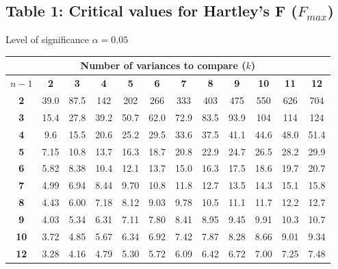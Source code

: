 \subsection{Table 1: Critical values for Hartley’s F ($F_{max}$)}
\label{table1}

Level of significance $\alpha = 0.05$ \\
\begin{center}
\small
\begin{tabular}{c|c|c|c|c|c|c|c|c|c|c|c}
\hline
\multicolumn{12}{c}{\textbf{Number of variances to compare} ($k$)}                    \bstrut\tstrut\\
\hline
$n - 1$ & \multicolumn{1}{c}{\textbf{2}}    & \multicolumn{1}{c}{\textbf{3}}    & \multicolumn{1}{c}{\textbf{4}}    & \multicolumn{1}{c}{\textbf{5}}    & \multicolumn{1}{c}{\textbf{6}}    & \multicolumn{1}{c}{\textbf{7}}    & \multicolumn{1}{c}{\textbf{8}}    & \multicolumn{1}{c}{\textbf{9}}    & \multicolumn{1}{c}{\textbf{10}}   & \multicolumn{1}{c}{\textbf{11}}   & \multicolumn{1}{c}{\textbf{12}} \bstrut\tstrut\\
\hline
\textbf{2}     & 39.0 & 87.5 & 142  & 202  & 266  & 333  & 403  & 475  & 550  & 626  & 704  \bstrut\tstrut\\
\textbf{3}     & 15.4 & 27.8 & 39.2 & 50.7 & 62.0 & 72.9 & 83.5 & 93.9 & 104  & 114  & 124  \bstrut\tstrut\\
\textbf{4}     & 9.6  & 15.5 & 20.6 & 25.2 & 29.5 & 33.6 & 37.5 & 41.1 & 44.6 & 48.0 & 51.4 \bstrut\tstrut\\
\textbf{5}     & 7.15 & 10.8 & 13.7 & 16.3 & 18.7 & 20.8 & 22.9 & 24.7 & 26.5 & 28.2 & 29.9 \bstrut\tstrut\\
\textbf{6}     & 5.82 & 8.38 & 10.4 & 12.1 & 13.7 & 15.0 & 16.3 & 17.5 & 18.6 & 19.7 & 20.7 \bstrut\tstrut\\
\textbf{7}     & 4.99 & 6.94 & 8.44 & 9.70 & 10.8 & 11.8 & 12.7 & 13.5 & 14.3 & 15.1 & 15.8 \bstrut\tstrut\\
\textbf{8}     & 4.43 & 6.00 & 7.18 & 8.12 & 9.03 & 9.78 & 10.5 & 11.1 & 11.7 & 12.2 & 12.7 \bstrut\tstrut\\
\textbf{9}     & 4.03 & 5.34 & 6.31 & 7.11 & 7.80 & 8.41 & 8.95 & 9.45 & 9.91 & 10.3 & 10.7 \bstrut\tstrut\\
\textbf{10}    & 3.72 & 4.85 & 5.67 & 6.34 & 6.92 & 7.42 & 7.87 & 8.28 & 8.66 & 9.01 & 9.34 \bstrut\tstrut\\
\textbf{12}    & 3.28 & 4.16 & 4.79 & 5.30 & 5.72 & 6.09 & 6.42 & 6.72 & 7.00 & 7.25 & 7.48 \bstrut\tstrut\\

\end{tabular}
\end{center}
